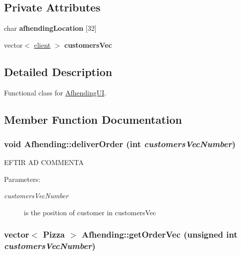 \subsection*{Private Attributes}
\begin{CompactItemize}
\item 
\hypertarget{class_afhending_85acd631eb078696afb9935bedeeb107}{
char {\bf afhending\-Location} \mbox{[}32\mbox{]}}
\label{class_afhending_85acd631eb078696afb9935bedeeb107}

\item 
\hypertarget{class_afhending_52cc86469dd41b9be5b7186d6bd00589}{
vector$<$ \hyperlink{classclient}{client} $>$ {\bf customers\-Vec}}
\label{class_afhending_52cc86469dd41b9be5b7186d6bd00589}

\end{CompactItemize}


\subsection{Detailed Description}
Functional class for \hyperlink{class_afhending_u_i}{Afhending\-UI}. 



\subsection{Member Function Documentation}
\hypertarget{class_afhending_b3cb078e2502d2eb7e6e67623cbe30b9}{
\subsubsection[deliverOrder]{\setlength{\rightskip}{0pt plus 5cm}void Afhending::deliver\-Order (int {\em customers\-Vec\-Number})}}
\label{class_afhending_b3cb078e2502d2eb7e6e67623cbe30b9}


EFTIR AD  COMMENTA

\begin{Desc}
\item[Parameters:]
\begin{description}
\item[{\em customers\-Vec\-Number}]is the position of customer in customers\-Vec \end{description}
\end{Desc}
\hypertarget{class_afhending_ad0cbeddec394b25c5eade57247f4110}{
\subsubsection[getOrderVec]{\setlength{\rightskip}{0pt plus 5cm}vector$<$ Pizza $>$ Afhending::get\-Order\-Vec (unsigned int {\em customers\-Vec\-Number})}}
\label{class_afhending_ad0cbeddec394b25c5eade57247f4110}


